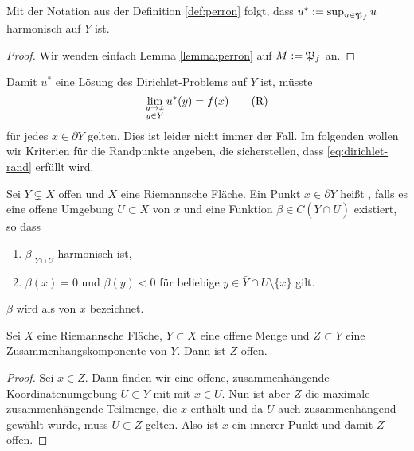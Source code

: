 \begin{cor}
  Mit der Notation aus der Definition \ref{def:perron} folgt, dass $u^\ast := \sup_{u
    \in \mathfrak{P}_f} u$ harmonisch auf $Y$ ist.
\end{cor}

\begin{proof}
  Wir wenden einfach Lemma \ref{lemma:perron} auf $M := \mathfrak{P}_f$ an.
\end{proof}

\begin{rem}
  Damit $u^\ast$ eine Lösung des Dirichlet-Problems auf $Y$ ist,
  müsste
  \[
  \lim_{\substack{y\rightarrow x\\y \in Y}}u^\ast(y) =
  f(x) \label{eq:dirichlet-rand} \tag{R}
  \]
  für jedes $x \in \partial Y$ gelten. Dies ist leider nicht immer der
  Fall. Im folgenden wollen wir Kriterien für die Randpunkte angeben,
  die sicherstellen, dass \eqref{eq:dirichlet-rand} erfüllt wird.
\end{rem}

\begin{defin}
  Sei $Y \subsetneq X$ offen und $X$ eine Riemannsche Fläche. Ein
  Punkt $x \in \partial Y$ heißt , falls es eine
  offene Umgebung $U \subset X$ von $x$ und eine Funktion $\beta  \in
  C(\bar Y \cap U)$ existiert, so dass
  \begin{enumerate}
  \item $\beta|_{Y \cap U}$ harmonisch ist,
  \item $\beta(x) =0$ und $\beta(y) < 0$ für beliebige $y \in \bar Y
    \cap U \setminus \{x\}$ gilt.
  \end{enumerate}
  $\beta$ wird als  von $x$ bezeichnet.
\end{defin}

\begin{lemma}
  \label{lemma:zsh-komp}
  Sei $X$ eine Riemannsche Fläche, $Y \subset X$ eine offene Menge und
  $Z \subset Y$ eine Zusammenhangskomponente von $Y$. Dann ist $Z$ offen.
\end{lemma}

\begin{proof}
  Sei $x \in Z$. Dann finden wir eine offene, zusammenhängende
  Koordinatenumgebung $U \subset Y$ mit mit $x \in U$. Nun ist aber
  $Z$ die maximale zusammenhängende Teilmenge, die $x$ enthält und da
  $U$ auch zusammenhängend gewählt wurde, muss $U \subset Z$
  gelten. Also ist $x$ ein innerer Punkt und damit $Z$ offen.
\end{proof}

